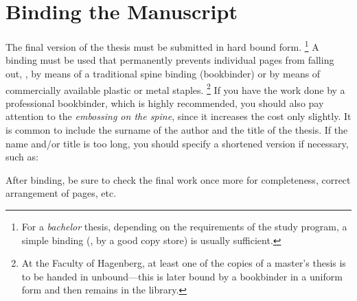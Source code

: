 \section{Binding the Manuscript}

The final version of the thesis must be submitted in hard bound form.%
\footnote{For a \emph{bachelor} thesis, depending on the requirements of the study
program, a simple binding (\eg, by a good copy store) is usually sufficient.}
A binding must be used that permanently prevents individual pages from falling out,
\eg, by means of a traditional spine binding (bookbinder) or by means of 
commercially available plastic or metal staples.%
\footnote{At the Faculty of Hagenberg, at least one of the copies of a master's
thesis is to be handed in unbound---this is later bound by a bookbinder in a
uniform form and then remains in the library.}
If you have the work done by a professional bookbinder, which is highly recommended,
you should also pay attention to the \emph{embossing on the spine}, since
it increases the cost only slightly. It is common to include the surname of the author
and the title of the thesis. If the name and/or title is too long, you should specify
a shortened version if necessary, such as:
%
\begin{center}
	\setlength{\fboxsep}{3mm}
\end{center}
%
After binding, be sure to check the final work once more for completeness, correct 
arrangement of pages, etc.